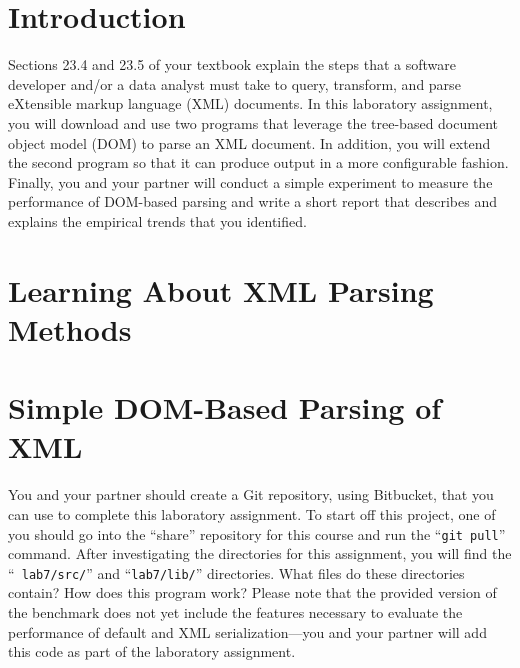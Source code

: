 


\usepackage[compact]{titlesec}



\section*{Introduction}

Sections 23.4 and 23.5 of your textbook explain the steps that a software developer and/or a data analyst must take to
query, transform, and parse eXtensible markup language (XML) documents. In this laboratory assignment, you will download
and use two programs that leverage the tree-based document object model (DOM) to parse an XML document.  In addition,
you will extend the second program so that it can produce output in a more configurable fashion.  Finally, you and your
partner will conduct a simple experiment to measure the performance of DOM-based parsing and write a short report that
describes and explains the empirical trends that you identified.

\vspace*{-.05in}
\section*{Learning About XML Parsing Methods}



\vspace*{-.05in}
\section*{Simple DOM-Based Parsing of XML}

You and your partner should create a Git repository, using Bitbucket, that you can use to complete this laboratory
assignment.  To start off this project, one of you should go into the ``share'' repository for this course and run the
``{\tt git pull}'' command. After investigating the directories for this assignment, you will find the ``{\tt
  lab7/src/}'' and ``{\tt lab7/lib/}'' directories. What files do these directories contain? How does this program work?
Please note that the provided version of the benchmark does not yet include the features necessary to evaluate the
performance of default and XML serialization---you and your partner will add this code as part of the laboratory
assignment.


